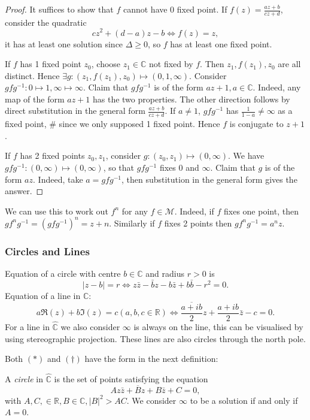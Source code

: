 \documentclass[a4paper]{article}
\begin{document}
      \begin{proof}
            It suffices to show that $f$ cannot have 0 fixed point.
            If $ f(z)=\frac{az+b}{cz+d} $, consider the quadratic
            \[
                cz^2+(d-a)z-b \Longleftrightarrow f(z)=z,
            \]
            it has at least one solution since $ \Delta\ge 0 $, so $f$ has at least one fixed point.

            If $f$ has 1 fixed point $z_0$, choose $z_1\in \mathbb{C}$ not fixed by $f$. Then $ z_1,f(z_1),z_0 $ are all distinct. Hence $ \exists g:(z_1,f(z_1),z_0)\mapsto (0,1,\infty) $. Consider $ gfg^{-1}: 0 \mapsto 1, \infty \mapsto \infty $. Claim that $gfg^{-1}$ is of the form $ az+1,a\in \mathbb{C} $. Indeed, any map of the form $az+1$ has the two properties. The other direction follows by direct substitution in the general form $\frac{az+b}{cz+d}$. If $a\neq 1$, $gfg^{-1}$ has $ \frac{1}{1-a}\neq \infty  $ as a fixed point, \# since we only supposed 1 fixed point. Hence $f$ is conjugate to $z+1$.
            
            If $f$ has 2 fixed points $z_0,z_1$, consider $ g:(z_0,z_1) \mapsto (0,\infty ) $. We have $ gfg^{-1}:(0,\infty ) \mapsto (0,\infty ) $, so that $gfg^{-1}$ fixes $0$ and $\infty$. Claim that $g$ is of the form $az$. Indeed, take $ a=gfg^{-1} $, then substitution in the general form gives the answer.
      \end{proof}
      We can use this to work out $f^n$ for any $ f\in \mathcal{M} $. Indeed, if $f$ fixes one point, then $gf^ng^{-1}=(gfg^{-1})^n=z+n$. Similarly if $f$ fixes 2 points then $ gf^ng^{-1}=a^n z $.
      \subsubsection{Circles and Lines}
      Equation of a circle with centre $b\in \mathbb{C}$ and radius $r>0$ is 
      \[
          |z-b|=r \Longleftrightarrow z \bar{z}- \bar{b}z-b \bar{z}+ b \bar{b}-r^2=0.\tag{$*$}
      \]
      Equation of a line in $\mathbb{C}$:
      \[
          a \Re (z)+b \Im (z)=c(a,b,c\in \mathbb{R}) \Longleftrightarrow \overline{\frac{a+ib}{2}}z+\frac{a+ib}{2}\bar{z}-c=0.\tag{$ \dagger $}
      \]
      For a line in $ \hat{\mathbb{C}} $ we also consider $ \infty  $ is always on the line, this can be visualised by using stereographic projection. These lines are also circles through the north pole.

      Both $ (*) $ and $(\dagger)$ have the form in the next definition:
      \begin{definition}
          A \textit{circle} in $ \hat{\mathbb{C}} $ is the set of points satisfying the equation
          \[
              Az \bar{z}+ \overline{B}z+B \bar{z}+C=0,
          \]
          with $ A,C,\in \mathbb{R}, B\in \mathbb{C}, |B|^2>AC $. We consider $ \infty  $ to be a solution if and only if $A=0$.
      \end{definition}
      
\end{document}
